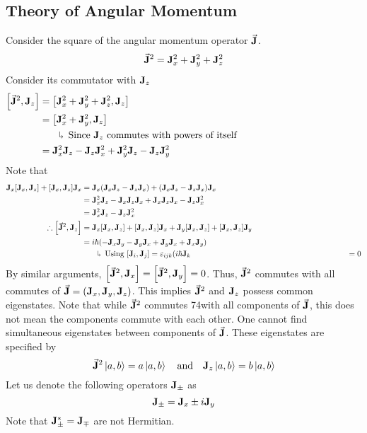 \documentclass[12pt,a4paper,titlepage]{article}
\newcommand{\trm}[1]{\textrm{#1}} %
\newcommand{\explain}[1]{%
	\quad\rotatebox[origin=c]{180}{\enskip$\Lsh$}\hfill
	\begin{minipage}[t]{\dimexpr\linewidth-8em\relax}
	#1
	\end{minipage}\hspace{4em}\bigskip
}
\begin{document}
\subsection{Theory of Angular Momentum}
Consider the square of the angular momentum operator $\vec{\vb{J}}$.
\begin{equation}
\vec{\vb{J}}^{2}=\vb{J}_{x}^{2}+\vb{J}_{y}^{2}+\vb{J}_{z}^{2}
\end{equation}
Consider its commutator with $\vb{J}_{z}$
\begin{equation}
\begin{aligned}
\comm{\vec{\vb{J}}^{2}}{\vb{J}_{z}}&=\comm{\vb{J}_{x}^{2}+\vb{J}_{y}^{2}+\vb{J}_{z}^{2}}{\vb{J}_{z}}\\
&=\comm{\vb{J}_{x}^{2}+\vb{J}_{y}^{2}}{\vb{J}_{z}}\\
&\quad\explain{Since $\vb{J}_{z}$ commutes with powers of itself}\\
&=\vb{J}_{x}^{2}\vb{J}_{z}-\vb{J}_{z}\vb{J}_{x}^{2}+\vb{J}_{y}^{2}\vb{J}_{z}-\vb{J}_{z}\vb{J}_{y}^{2}
\end{aligned}
\end{equation}
Note that
\begin{equation}
\begin{aligned}
\vb{J}_{x}\comm{\vb{J}_{x}}{\vb{J}_{z}}+\comm{\vb{J}_{x}}{\vb{J}_{z}}\vb{J}_{x}&=\vb{J}_{x}(\vb{J}_{x}\vb{J}_{z}-\vb{J}_{z}\vb{J}_{x})+(\vb{J}_{x}\vb{J}_{z}-\vb{J}_{z}\vb{J}_{x})\vb{J}_{x}\\
&=\vb{J}_{x}^{2}\vb{J}_{z}-\vb{J}_{x}\vb{J}_{z}\vb{J}_{x}+\vb{J}_{x}\vb{J}_{z}\vb{J}_{x}-\vb{J}_{z}\vb{J}_{x}^{2}\\
&=\vb{J}_{x}^{2}\vb{J}_{z}-\vb{J}_{z}\vb{J}_{x}^{2}\\
\therefore \comm{\vec{\vb{J}}^{2}}{\vb{J}_{z}}&=\vb{J}_{x}\comm{\vb{J}_{x}}{\vb{J}_{z}}+\comm{\vb{J}_{x}}{\vb{J}_{z}}\vb{J}_{x}+\vb{J}_{y}\comm{\vb{J}_{x}}{\vb{J}_{z}}+\comm{\vb{J}_{x}}{\vb{J}_{z}}\vb{J}_{y}\\
&=i\hbar\qty(-\vb{J}_{x}\vb{J}_{y}-\vb{J}_{y}\vb{J}_{x}+\vb{J}_{y}\vb{J}_{x}+\vb{J}_{x}\vb{J}_{y})\\
&\quad\explain{Using $\comm{\vb{J}_{i}}{\vb{J}_{j}}=\varepsilon_{ijk}(i\hbar\vb{J}_{k}$}
&=0
\end{aligned}
\end{equation}
By similar arguments, $\comm{\vec{\vb{J}}^{2}}{\vb{J}_{x}}=\comm{\vec{\vb{J}}^{2}}{\vb{J}_{y}}=0$. Thus, $\vec{\vb{J}}^{2}$ commutes with all commutes of $\vec{\vb{J}}=(\vb{J}_{x},\vb{J}_{y},\vb{J}_{z})$. This implies $\vec{\vb{J}}^{2}$ and $\vb{J}_{z}$ possess common eigenstates. Note that while $\vec{\vb{J}}^{2}$ commutes 74with all components of $\vec{\vb{J}}$, this does not mean the components commute with each other. One cannot find simultaneous eigenstates between components of $\vec{\vb{J}}$. These eigenstates are specified by
\begin{equation}
\vec{\vb{J}}^{2}\ket{a,b}=a\ket{a,b}\quad\trm{and}\quad\vb{J}_{z}\ket{a,b}=b\ket{a,b}
\end{equation}
Let us denote the following operators $\vb{J}_{\pm}$ as
\begin{equation}
\vb{J}_{\pm}=\vb{J}_{x}\pm i\vb{J}_{y}
\end{equation}
Note that $\vb{J}_{\pm}^{*}=\vb{J}_{\mp}$ are not Hermitian.
\end{document}
